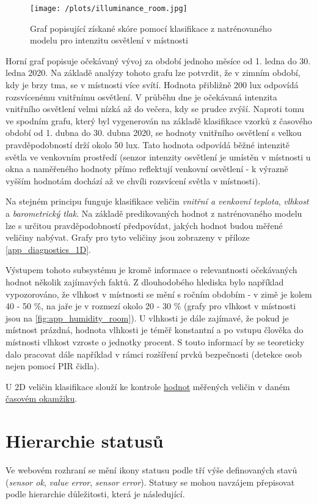 \begin{figure}[H]
  \centering
  \texttt{[image: /plots/illuminance\_room.jpg]}
  \caption{Graf popisující získané skóre pomocí klasifikace z natrénovaného modelu pro intenzitu osvětlení v místnosti}
  \label{fig:2D_illuminance_room}
\end{figure}

Horní graf popisuje očekávaný vývoj za období jednoho měsíce od 1. ledna do 30. ledna 2020. Na základě analýzy tohoto grafu lze potvrdit, že v zimním období, kdy je brzy tma, se v místnosti více svítí. Hodnota přibližně 200 lux odpovídá rozsvícenému vnitřnímu osvětlení. V průběhu dne je očekávaná intenzita vnitřního osvětlení velmi nízká až do večera, kdy se prudce zvýší. Naproti tomu ve spodním grafu, který byl vygenerován na základě klasifikace vzorků z časového období od 1. dubna do 30. dubna 2020, se hodnoty vnitřního osvětlení s velkou pravděpodobností drží okolo 50 lux. Tato hodnota odpovídá běžné intenzitě světla ve venkovním prostředí (senzor intenzity osvětlení je umístěn v místnosti u okna a naměřeného hodnoty přímo reflektují venkovní osvětlení - k výrazně vyšším hodnotám dochází až ve chvíli rozsvícení světla v místnosti). \par
Na stejném principu funguje klasifikace veličin \textit{vnitřní a venkovní teplota}, \textit{vlhkost} a \textit{barometrický tlak}. Na základě predikovaných hodnot z natrénovaného modelu lze s určitou pravděpodobností předpovídat, jakých hodnot budou měřené veličiny nabývat. Grafy pro tyto veličiny jsou zobrazeny v příloze  \ref{app_diagnostics_1D}. \par
Výstupem tohoto subsystému je kromě informace o relevantnosti očekávaných hodnot několik zajímavých faktů. Z dlouhodobého hlediska bylo například vypozorováno, že vlhkost v místnosti se mění s ročním obdobím - v zimě je kolem 40 - 50 \%, na jaře je v rozmezí okolo 20 - 30 \% (grafy pro vlhkost v místnosti jsou na \cref{fig:app_humidity_room}). U vlhkosti je dále zajímavé, že pokud je místnost prázdná, hodnota vlhkosti je téměř konstantní a po vstupu člověka do místnosti vlhkost vzroste o jednotky procent. S touto informací by se teoreticky dalo pracovat dále například v rámci rozšíření prvků bezpečnosti (detekce osob nejen pomocí PIR čidla). \par
U 2D veličin klasifikace slouží ke kontrole \underline{hodnot} měřených veličin v daném \underline{časovém okamžiku}. 

\section*{Hierarchie statusů}
Ve webovém rozhraní se mění ikony statusu podle tří výše definovaných stavů (\textit{sensor ok}, \textit{value error}, \textit{sensor error}). Statusy se mohou navzájem přepisovat podle hierarchie důležitosti, která je následující.  \par

